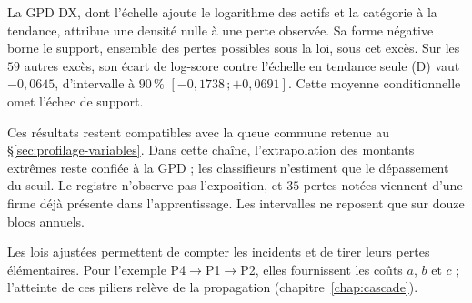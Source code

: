 La GPD DX, dont l'échelle ajoute le logarithme des actifs et la catégorie à la tendance,
attribue une densité nulle à une perte observée.
Sa forme négative borne le support, ensemble des pertes possibles sous la loi, sous cet excès.
Sur les $59$ autres excès, son écart de log-score contre l'échelle en tendance seule (D) vaut
$-0{,}0645$, d'intervalle à $90\,\%$ $[-0{,}1738\,;+0{,}0691]$. Cette moyenne conditionnelle
omet l'échec de support.

Ces résultats restent compatibles avec la queue commune retenue au \S\ref{sec:profilage-variables}.
Dans cette chaîne, l'extrapolation des montants extrêmes reste confiée à la GPD ; les classifieurs
n'estiment que le dépassement du seuil. Le registre n'observe pas l'exposition, et $35$ pertes
notées viennent d'une firme déjà présente dans l'apprentissage. Les intervalles ne reposent
que sur douze blocs annuels.

Les lois ajustées permettent de compter les incidents et de tirer leurs pertes élémentaires.
Pour l'exemple P4$\to$P1$\to$P2, elles fournissent les coûts $a$, $b$ et $c$ ; l'atteinte de ces
piliers relève de la propagation (chapitre~\ref{chap:cascade}).
